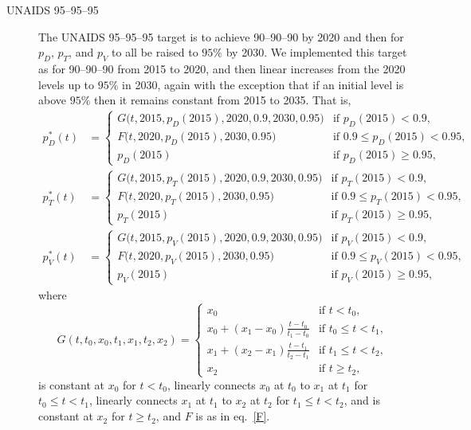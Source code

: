 \documentclass{article}
\begin{document}
\begin{description}
\item[UNAIDS 95--95--95] The UNAIDS 95--95--95 target is to achieve
  90--90--90 by 2020 and then for $p_D$, $p_T$, and $p_V$ to all be
  raised to $95\%$ by 2030.  We implemented this target as for
  90--90--90 from 2015 to 2020, and then linear increases from the
  2020 levels up to $95\%$ in 2030, again with the exception that if
  an initial level is above $95\%$ then it remains constant from 2015
  to 2035.  That is,
  \begin{equation}
    \label{unaids95_targets}
    \begin{split}
      p_D^*(t) &=
      \begin{cases}
        G\big(t, 2015, p_D(2015), 2020, 0.9, 2030, 0.95\big)
        & \text{if $p_D(2015) < 0.9$},
        \\
        F\big(t, 2020, p_D(2015), 2030, 0.95\big)
        & \text{if $0.9 \leq p_D(2015) < 0.95$},
        \\
        p_D(2015) & \text{if $p_D(2015) \geq 0.95$},
      \end{cases}
      \\
      p_T^*(t) &=
      \begin{cases}
        G\big(t, 2015, p_T(2015), 2020, 0.9, 2030, 0.95\big)
        & \text{if $p_T(2015) < 0.9$},
        \\
        F\big(t, 2020, p_T(2015), 2030, 0.95\big)
        & \text{if $0.9 \leq p_T(2015) < 0.95$},
        \\
        p_T(2015) & \text{if $p_T(2015) \geq 0.95$},
      \end{cases}
      \\
      p_V^*(t) &=
      \begin{cases}
        G\big(t, 2015, p_V(2015), 2020, 0.9, 2030, 0.95\big)
        & \text{if $p_V(2015) < 0.9$},
        \\
        F\big(t, 2020, p_V(2015), 2030, 0.95\big)
        & \text{if $0.9 \leq p_V(2015) < 0.95$},
        \\
        p_V(2015) & \text{if $p_V(2015) \geq 0.95$},
      \end{cases}
    \end{split}
  \end{equation}
  where
  \begin{equation}
    G(t, t_0, x_0, t_1, x_1, t_2, x_2) =
    \begin{cases}
      x_0 & \text{if $t < t_0$},
      \\
      x_0 + (x_1 - x_0) \frac{t - t_0}{t_1 - t_0} &
      \text{if $t_0 \leq t < t_1$},
      \\
      x_1 + (x_2 - x_1) \frac{t - t_1}{t_2 - t_1} &
      \text{if $t_1 \leq t < t_2$},
      \\
      x_2 & \text{if $t \geq t_2$},
    \end{cases}
  \end{equation}
  is constant at $x_0$ for $t < t_0$, linearly connects $x_0$ at $t_0$
  to $x_1$ at $t_1$ for $t_0 \leq t < t_1$, linearly connects $x_1$ at
  $t_1$ to $x_2$ at $t_2$ for $t_1 \leq t < t_2$, and is constant at
  $x_2$ for $t \geq t_2$, and $F$ is as in eq.~\eqref{F}.

\end{description}
\end{document}
